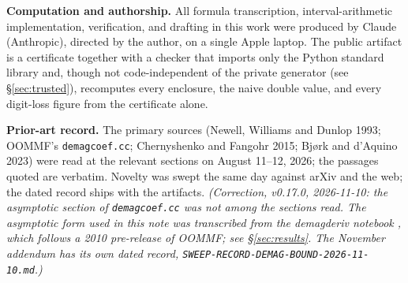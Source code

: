 \documentclass[11pt]{amsart}
\theoremstyle{plain}
\theoremstyle{definition}
\theoremstyle{remark}
\begin{document}
\begin{abstract}
The enclosures remain tight to tens of digits everywhere, including where double
precision has none. A certificate JSON and a standard-library checker are the
public unit; the checker re-derives every enclosure, the naive value and every
digit-loss figure from scratch, and rejects tampering both at the hash layer and
at the mathematical re-derivation layer. We state what is certified, what
is merely enclosed, and what is trusted, and close with the questions the table
opens. A November 2026 addendum (\S\ref{sec:bound}) proves an explicit bound on
the truncation error of the asymptotic series, valid for every rectangular cell,
every tensor component and every separation larger than the cell diagonal.
\emph{(Correction, v0.17.0, 2026-11-10: through v0.16.0 the abstract called the
second route ``OOMMF's asymptotic expansion''. The values measured are for a
three-term truncation of the series; OOMMF carries a fourth term. See
\S\ref{sec:results}. Its first sentence also counted MuMax3, which integrates
numerically, among codes using Newell's closed form.)}
\end{abstract}

\maketitle

{\small
\noindent\textbf{Computation and authorship.} All formula transcription,
interval-arithmetic implementation, verification, and drafting in this work were
produced by Claude (Anthropic), directed by the author, on a single Apple laptop.
The public artifact is a certificate together with a checker that imports only
the Python standard library and, though not code-independent of the private
generator (see \S\ref{sec:trusted}), recomputes every enclosure, the naive double
value, and every digit-loss figure from the certificate alone.

\smallskip
\noindent\textbf{Prior-art record.} The primary sources (Newell, Williams and
Dunlop 1993; OOMMF's \texttt{demagcoef.cc}; Chernyshenko and Fangohr 2015;
Bj\o rk and d'Aquino 2023) were read at the relevant sections on August 11--12,
2026; the passages quoted are verbatim. Novelty was swept the same day against
arXiv and the web; the dated record ships with the artifacts.
\emph{(Correction, v0.17.0, 2026-11-10: the asymptotic section of
\texttt{demagcoef.cc} was not among the sections read. The asymptotic form used
in this note was transcribed from the demagderiv notebook \cite{demagderiv},
which follows a 2010 pre-release of OOMMF; see \S\ref{sec:results}. The November
addendum has its own dated record,
\texttt{SWEEP-RECORD-DEMAG-BOUND-2026-11-10.md}.)}\par}
\end{document}

